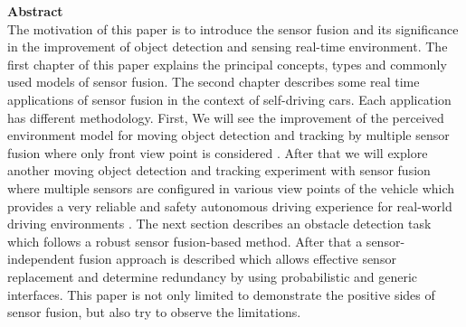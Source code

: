 {\bf\Large Abstract} \\ [1em]
The motivation of this paper is to introduce the sensor fusion and its significance in the improvement of object detection and sensing real-time environment. The first chapter of this paper explains the principal concepts, types and commonly used models of sensor fusion\cite{Wilfried2002}. The second chapter describes some real time applications of sensor fusion in the context of self-driving cars. Each application has different methodology. First, We will see the improvement of the perceived environment model for moving object detection and tracking by multiple sensor fusion where only front view point is considered \cite{Chavez_Garcia_2016}. After that we will explore another moving object detection and tracking experiment with sensor fusion where multiple sensors are configured in various view points of the vehicle which provides a very reliable and safety autonomous driving experience for real-world driving environments \cite{Cho_2014}. The next section describes an obstacle detection task which follows a robust sensor fusion-based method\cite{Shinzato_2014}. After that a sensor-independent fusion approach is described which allows effective sensor replacement and determine redundancy by using probabilistic and generic interfaces\cite{Kunz_2015}. This paper is not only limited to demonstrate the positive sides of sensor fusion, but also try to observe the limitations\cite{Wilfried2002}.